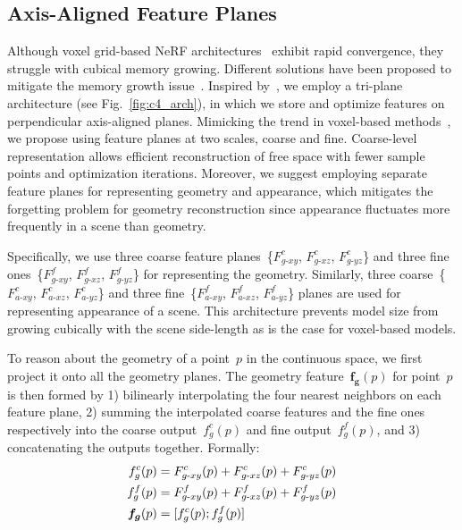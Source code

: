 \subsection{Axis-Aligned Feature Planes} \label{sec:c4_feat_planes}
Although voxel grid-based NeRF architectures~\cite{fridovich2022plenoxels, sun2022direct, wang2022go} exhibit rapid convergence, they struggle with cubical memory growing. Different solutions have been proposed to mitigate the memory growth issue~\cite{muller2022instant, Chen2022ECCV, chan2022efficient}. Inspired by~\cite{chan2022efficient}, we employ a tri-plane architecture (see Fig.~\ref{fig:c4_arch}), in which we store and optimize features on perpendicular axis-aligned planes. Mimicking the trend in voxel-based methods~\cite{muller2022instant, sun2022direct, Chen2022ECCV}, we propose using feature planes at two scales, \ie coarse and fine. Coarse-level representation allows efficient reconstruction of free space with fewer sample points and optimization iterations. Moreover, we suggest employing separate feature planes for representing geometry and appearance, which mitigates the forgetting problem for geometry reconstruction since appearance fluctuates more frequently in a scene than geometry.

Specifically, we use three coarse feature planes~\{$F^{c}_{g\text{-}xy}$, $F^{c}_{g\text{-}xz}$, $F^{c}_{g\text{-}yz}$\} and three fine ones~\{$F^{f}_{g\text{-}xy}$, $F^{f}_{g\text{-}xz}$, $F^{f}_{g\text{-}yz}$\} for representing the geometry. Similarly, three coarse~\{$F^{c}_{a\text{-}xy}$, $F^{c}_{a\text{-}xz}$, $F^{c}_{a\text{-}yz}$\} and three fine~\{$F^{f}_{a\text{-}xy}$, $F^{f}_{a\text{-}xz}$, $F^{f}_{a\text{-}yz}$\} planes are used for representing appearance of a scene. This architecture prevents model size from growing cubically with the scene side-length as is the case for voxel-based models.

To reason about the geometry of a point~$p$ in the continuous space, we first project it onto all the geometry planes. The geometry feature~$\boldsymbol{f_{g}}(p)$ for point~$p$ is then formed by 1) bilinearly interpolating the four nearest neighbors on each feature plane, 2) summing the interpolated coarse features and the fine ones respectively into the coarse output~$f^{c}_{g}(p)$ and fine output~$f^{f}_{g}(p)$, and 3) concatenating the outputs together. Formally: 
\begin{align}
	f^{c}_{g}(p) &= F^{c}_{g\text{-}xy}(p) + F^{c}_{g\text{-}xz}(p) + F^{c}_{g\text{-}yz}(p) \notag \\
	f^{f}_{g}(p) &= F^{f}_{g\text{-}xy}(p) + F^{f}_{g\text{-}xz}(p) + F^{f}_{g\text{-}yz}(p) \notag \\
	\boldsymbol{f_{g}}(p) &= [f^{c}_{g}(p) ; f^{f}_{g}(p)]
\end{align}

